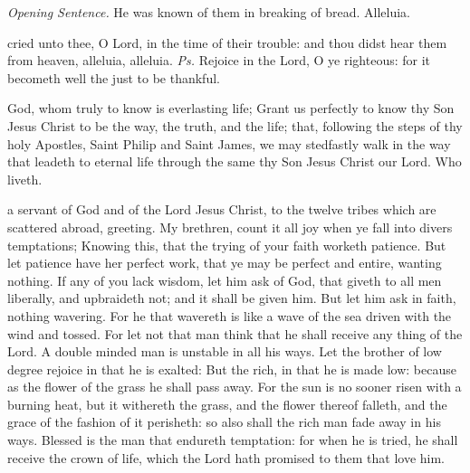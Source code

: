 \par\noindent
\textit{Opening Sentence.} He was known of them in breaking of bread. Alleluia.\par

\introit
{} cried unto thee, O Lord, in the time of their trouble: and thou didst hear them from heaven, alleluia, alleluia. \textit{Ps.} Rejoice in the Lord, O ye righteous: for it becometh well the just to be thankful.

\collect
{} God, whom truly to know is everlasting life; Grant us perfectly to know thy Son Jesus Christ to be the way, the truth, and the life; that, following the steps of thy holy Apostles, Saint Philip and Saint James, we may stedfastly walk in the way that leadeth to eternal life through the same thy Son Jesus Christ our Lord. Who liveth.

 a servant of God and of the Lord Jesus Christ, to the twelve tribes which are scattered abroad, greeting. My brethren, count it all joy when ye fall into divers temptations; Knowing this, that the trying of your faith worketh patience. But let patience have her perfect work, that ye may be perfect and entire, wanting nothing. If any of you lack wisdom, let him ask of God, that giveth to all men liberally, and upbraideth not; and it shall be given him. But let him ask in faith, nothing wavering. For he that wavereth is like a wave of the sea driven with the wind and tossed. For let not that man think that he shall receive any thing of the Lord. A double minded man is unstable in all his ways. Let the brother of low degree rejoice in that he is exalted: But the rich, in that he is made low: because as the flower of the grass he shall pass away. For the sun is no sooner risen with a burning heat, but it withereth the grass, and the flower thereof falleth, and the grace of the fashion of it perisheth: so also shall the rich man fade away in his ways. Blessed is the man that endureth temptation: for when he is tried, he shall receive the crown of life, which the Lord hath promised to them that love him.

